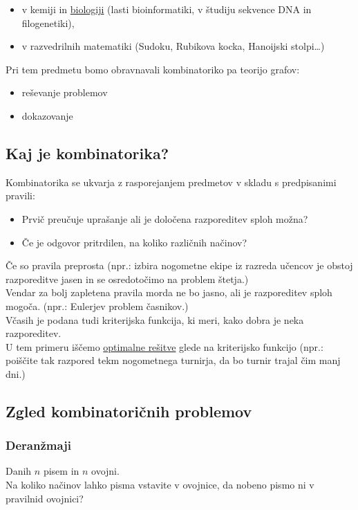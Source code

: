 \documentclass[12pt]{article}
\begin{document}
\begin{itemize}
    \item v kemiji in \underline{biologiji} (lasti bioinformatiki, v študiju sekvence DNA in filogenetiki),
    \item v razvedrilnih matematiki (Sudoku, Rubikova kocka, Hanoijski stolpi\dots)
\end{itemize}
Pri tem predmetu bomo obravnavali kombinatoriko pa teorijo grafov:
\begin{itemize}
    \item reševanje problemov
    \item dokazovanje
\end{itemize}

\subsection{Kaj je kombinatorika?}
Kombinatorika se ukvarja z rasporejanjem predmetov v skladu s predpisanimi pravili:
\begin{itemize}
    \item Prvič preučuje uprašanje ali je določena razporeditev sploh možna?
    \item Če je odgovor pritrdilen, na koliko različnih načinov?
\end{itemize}

\noindent
Če so pravila preprosta (npr.: izbira nogometne ekipe iz razreda učencov je obstoj razporeditve jasen in se osredotočimo na problem štetja.) \\

\noindent
Vendar za bolj zapletena pravila morda ne bo jasno, ali je razporeditev sploh mogoča. (npr.: Eulerjev problem časnikov.) \\

\noindent
Včasih je podana tudi kriterijska funkcija, ki meri, kako dobra je neka razporeditev. \\
U tem primeru iščemo \underline{optimalne rešitve} glede na kriterijsko funkcijo (npr.: poiščite tak razpored tekm nogometnega turnirja, da bo turnir trajal čim manj dni.)

\subsection{Zgled kombinatoričnih problemov}
\subsubsection{Deranžmaji}
\begin{center}
\end{center}
Danih $n$ pisem in $n$ ovojni. \\
Na koliko načinov lahko pisma vstavite v ovojnice, da nobeno pismo ni v pravilnid ovojnici? \\
\end{document}

